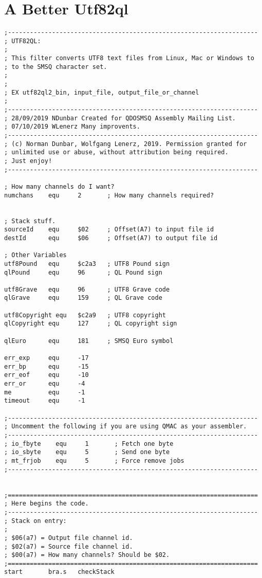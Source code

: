 \section{A Better Utf82ql}

\begin{lstlisting}[firstnumber=1, caption={Wolfgang's improved utf82ql Utility}]
;--------------------------------------------------------------------
; UTF82QL:
;
; This filter converts UTF8 text files from Linux, Mac or Windows to
; to the SMSQ character set.
;
;
; EX utf82ql2_bin, input_file, output_file_or_channel
;
;--------------------------------------------------------------------
; 28/09/2019 NDunbar Created for QDOSMSQ Assembly Mailing List.
; 07/10/2019 WLenerz Many improvents.
;--------------------------------------------------------------------
; (c) Norman Dunbar, Wolfgang Lenerz, 2019. Permission granted for
; unlimited use or abuse, without attribution being required.
; Just enjoy!
;--------------------------------------------------------------------

; How many channels do I want?
numchans    equ     2       ; How many channels required?


; Stack stuff.
sourceId    equ     $02     ; Offset(A7) to input file id
destId      equ     $06     ; Offset(A7) to output file id

; Other Variables
utf8Pound   equ     $c2a3   ; UTF8 Pound sign
qlPound     equ     96      ; QL Pound sign

utf8Grave   equ     96      ; UTF8 Grave code
qlGrave     equ     159     ; QL Grave code

utf8Copyright equ   $c2a9   ; UTF8 copyright
qlCopyright equ     127     ; QL copyright sign

qlEuro      equ     181     ; SMSQ Euro symbol

err_exp     equ     -17
err_bp      equ     -15
err_eof     equ     -10
err_or      equ     -4
me          equ     -1
timeout     equ     -1

;--------------------------------------------------------------------
; Uncomment the following if you are using QMAC as your assembler.
;--------------------------------------------------------------------
; io_fbyte    equ     1       ; Fetch one byte
; io_sbyte    equ     5       ; Send one byte
; mt_frjob    equ     5       ; Force remove jobs
;--------------------------------------------------------------------


;====================================================================
; Here begins the code.
;--------------------------------------------------------------------
; Stack on entry:
;
; $06(a7) = Output file channel id.
; $02(a7) = Source file channel id.
; $00(a7) = How many channels? Should be $02.
;====================================================================
start       bra.s   checkStack


\end{lstlisting}
